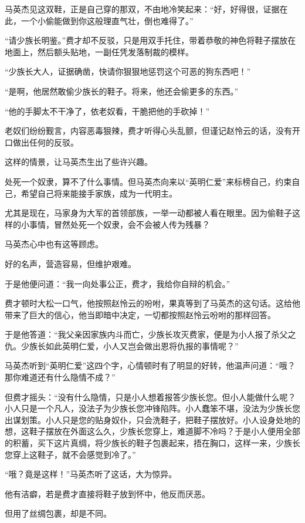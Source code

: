 \begin{this_body}
马英杰见这双鞋，正是自己穿的那双，不由地冷笑起来：“好，好得很，证据在此，一个小偷能做到你这般理直气壮，倒也难得了。”

“请少族长明鉴。”费才却不反驳，只是用双手托住，带着恭敬的神色将鞋子摆放在地面上，然后额头贴地，一副任凭发落制裁的模样。

“少族长大人，证据确凿，快请你狠狠地惩罚这个可恶的狗东西吧！”

“是啊，他居然敢偷少族长的鞋子。将来，他还会偷更多的东西。”

“他的手脚太不干净了，依老奴看，干脆把他的手砍掉！”

老奴们纷纷觐言，内容恶毒狠辣，费才听得心头乱颤，但谨记赵怜云的话，没有开口做出任何的反驳。

这样的情景，让马英杰生出了些许兴趣。

处死一个奴隶，算不了什么事情。但马英杰向来以“英明仁爱”来标榜自己，约束自己，希望自己将来能接手家族，成为一代明主。

尤其是现在，马家身为大军的首领部族，一举一动都被人看在眼里。因为偷鞋子这样的小事情，冒然处死一个奴隶，会不会被人传为残暴？

马英杰心中也有这等顾虑。

好的名声，营造容易，但维护艰难。

于是他便问道：“我一向处事公正，费才，我给你自辩的机会。”

费才顿时大松一口气，他按照赵怜云的吩咐，果真等到了马英杰的这句话。这给他带来了巨大的信心，他当即暗中决定，一切都按照赵怜云吩咐的那样回答。

于是他答道：“我父亲因家族内斗而亡，少族长攻灭费家，便是为小人报了杀父之仇。少族长如此英明仁爱，小人又岂会做出恩将仇报的事情呢？”

马英杰听到“英明仁爱”这四个字，心情顿时有了明显的好转，他温声问道：“哦？那你难道还有什么隐情不成？”

但费才摇头：“没有什么隐情，只是小人想着报答少族长您。但小人能做什么呢？小人只是一个凡人，没法子为少族长您冲锋陷阵。小人蠢笨不堪，没法为少族长您出谋划策。小人只是您的贴身奴仆，只会洗鞋子，把鞋子摆放好。小人设身处地的想，这鞋子摆放在外面这么久，少族长您穿上，难道脚不冷吗？于是小人便用全部的积蓄，买下这片真绸，将少族长的鞋子包裹起来，捂在胸口，这样一来，少族长您穿上这鞋子，就不会感觉到冷了。”

“哦？竟是这样！”马英杰听了这话，大为惊异。

他有洁癖，若是费才直接将鞋子放到怀中，他反而厌恶。

但用了丝绸包裹，却是不同。


\end{this_body}
